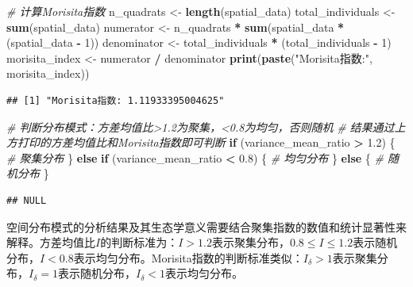 \documentclass[
  twoside,12pt,fontset=none]{ctexbook}
\newenvironment{Shaded}{\begin{snugshade}}{\end{snugshade}}
\newcommand{\CommentTok}[1]{\textcolor[rgb]{0.56,0.35,0.01}{\textit{#1}}}
\newcommand{\ControlFlowTok}[1]{\textcolor[rgb]{0.13,0.29,0.53}{\textbf{#1}}}
\newcommand{\DecValTok}[1]{\textcolor[rgb]{0.00,0.00,0.81}{#1}}
\newcommand{\FloatTok}[1]{\textcolor[rgb]{0.00,0.00,0.81}{#1}}
\newcommand{\FunctionTok}[1]{\textcolor[rgb]{0.13,0.29,0.53}{\textbf{#1}}}
\newcommand{\NormalTok}[1]{#1}
\newcommand{\OtherTok}[1]{\textcolor[rgb]{0.56,0.35,0.01}{#1}}
\newcommand{\SpecialCharTok}[1]{\textcolor[rgb]{0.81,0.36,0.00}{\textbf{#1}}}
\newcommand{\StringTok}[1]{\textcolor[rgb]{0.31,0.60,0.02}{#1}}
\begin{document}
\begin{Shaded}
\begin{Highlighting}[]
\CommentTok{\# 计算Morisita指数}
\NormalTok{n\_quadrats }\OtherTok{\textless{}{-}} \FunctionTok{length}\NormalTok{(spatial\_data)}
\NormalTok{total\_individuals }\OtherTok{\textless{}{-}} \FunctionTok{sum}\NormalTok{(spatial\_data)}
\NormalTok{numerator }\OtherTok{\textless{}{-}}\NormalTok{ n\_quadrats }\SpecialCharTok{*} \FunctionTok{sum}\NormalTok{(spatial\_data }\SpecialCharTok{*}\NormalTok{ (spatial\_data }\SpecialCharTok{{-}} \DecValTok{1}\NormalTok{))}
\NormalTok{denominator }\OtherTok{\textless{}{-}}\NormalTok{ total\_individuals }\SpecialCharTok{*}\NormalTok{ (total\_individuals }\SpecialCharTok{{-}} \DecValTok{1}\NormalTok{)}
\NormalTok{morisita\_index }\OtherTok{\textless{}{-}}\NormalTok{ numerator }\SpecialCharTok{/}\NormalTok{ denominator}
\FunctionTok{print}\NormalTok{(}\FunctionTok{paste}\NormalTok{(}\StringTok{"Morisita指数:"}\NormalTok{, morisita\_index))}
\end{Highlighting}
\end{Shaded}

\begin{verbatim}
## [1] "Morisita指数: 1.11933395004625"
\end{verbatim}

\begin{Shaded}
\begin{Highlighting}[]
\CommentTok{\# 判断分布模式：方差均值比\textgreater{}1.2为聚集，\textless{}0.8为均匀，否则随机}
\CommentTok{\# 结果通过上方打印的方差均值比和Morisita指数即可判断}
\ControlFlowTok{if}\NormalTok{ (variance\_mean\_ratio }\SpecialCharTok{\textgreater{}} \FloatTok{1.2}\NormalTok{) \{}
  \CommentTok{\# 聚集分布}
\NormalTok{\} }\ControlFlowTok{else} \ControlFlowTok{if}\NormalTok{ (variance\_mean\_ratio }\SpecialCharTok{\textless{}} \FloatTok{0.8}\NormalTok{) \{}
  \CommentTok{\# 均匀分布}
\NormalTok{\} }\ControlFlowTok{else}\NormalTok{ \{}
  \CommentTok{\# 随机分布}
\NormalTok{\}}
\end{Highlighting}
\end{Shaded}

\begin{verbatim}
## NULL
\end{verbatim}

空间分布模式的分析结果及其生态学意义需要结合聚集指数的数值和统计显著性来解释。方差均值比\(I\)的判断标准为：\(I > 1.2\)表示聚集分布，\(0.8 \leq I \leq 1.2\)表示随机分布，\(I < 0.8\)表示均匀分布。Morisita指数的判断标准类似：\(I_\delta > 1\)表示聚集分布，\(I_\delta = 1\)表示随机分布，\(I_\delta < 1\)表示均匀分布。
\end{document}
